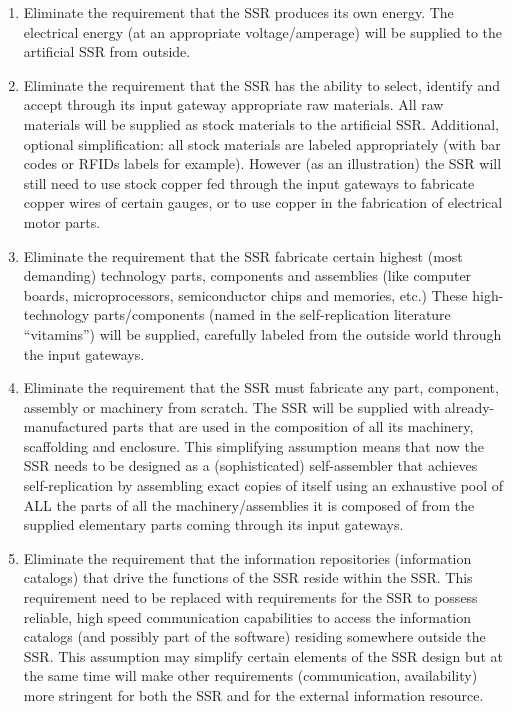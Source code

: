 \begin{enumerate}
\item Eliminate the requirement that the SSR produces its own energy.
The electrical energy (at an appropriate voltage/amperage) will be
supplied to the artificial SSR from outside.
\item Eliminate the requirement that the SSR has the ability to select,
identify and accept through its input gateway appropriate raw
materials. All raw materials will be supplied as stock materials to the
artificial SSR. Additional, optional simplification: all stock
materials are labeled appropriately (with bar codes or RFIDs labels for
example). However (as an illustration) the SSR will still need to use
stock copper fed through the input gateways to fabricate copper wires
of certain gauges, or to use copper in the fabrication of electrical
motor parts.
\item Eliminate the requirement that the SSR fabricate certain highest
(most demanding) technology parts, components and assemblies (like
computer boards, microprocessors, semiconductor chips and memories,
etc.) These high-technology parts/components (named in the
self-replication literature “vitamins”) will be supplied, carefully
labeled from the outside world through the input gateways.
\item Eliminate the requirement that the SSR must fabricate any part,
component, assembly or machinery from scratch. The SSR will be supplied
with already-manufactured parts that are used in the composition of all
its machinery, scaffolding and enclosure. This simplifying assumption
means that now the SSR needs to be designed as a (sophisticated)
self-assembler that achieves self-replication by assembling exact
copies of itself using an exhaustive pool of ALL the parts of all the
machinery/assemblies it is composed of from the supplied elementary
parts coming through its input gateways.
\item Eliminate the requirement that the information repositories
(information catalogs) that drive the functions of the SSR reside
within the SSR. This requirement need to be replaced with requirements
for the SSR to possess reliable, high speed communication capabilities
to access the information catalogs (and possibly part of the software)
residing somewhere outside the SSR. This assumption may simplify
certain elements of the SSR design but at the same time will make other
requirements (communication, availability) more stringent for both the
SSR and for the external information resource. 
\end{enumerate}

